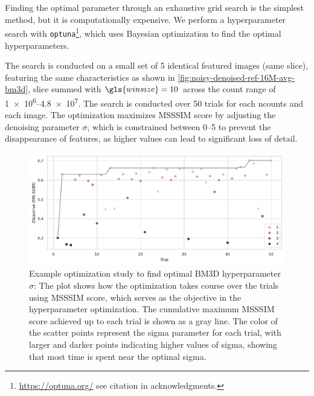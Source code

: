 
Finding the optimal parameter through an exhaustive grid search is the simplest method, but it is computationally expensive. We perform a hyperparameter search with \texttt{optuna}\footnote{\href{https://optuna.org/}{https://optuna.org/} see citation in acknowledgments.}, which uses Bayesian optimization to find the optimal hyperparameters.

The search is conducted  on a small set of \num{5} identical featured  images (same slice), featuring the same characteristics as shown in \cref{fig:noisy-denoised-ref-16M-avg-bm3d}, slice summed with $\gls{winsize} = \num{10}$ across the count range of \numrange{1e6}{4.8e7}. The search is conducted over \num{50} trials for each \gls{ncounts} and each image. The optimization maximizes \gls{MSSSIM} score by adjusting the denoising parameter $\sigma$, which is constrained between \numrange{0}{5} to prevent the disappearance of features, as higher values can lead to significant loss of detail.

\begin{figure}
    \centering
    \includegraphics[width=\textwidth]{images/optimization_against_trial.pdf}
    \caption{Example optimization study to find optimal BM3D hyperparameter $\sigma$: The plot shows how the optimization takes course over the trials using \gls{MSSSIM} score, which serves as the objective in the hyperparameter optimization. The cumulative maximum \gls{MSSSIM} score achieved up to each trial is shown as a gray line. The color of the scatter points represent the sigma parameter for each trial, with larger and darker points indicating higher values of sigma, showing that most time is spent near the optimal sigma.}
    \label{fig:optimization-against-trial}
\end{figure}

